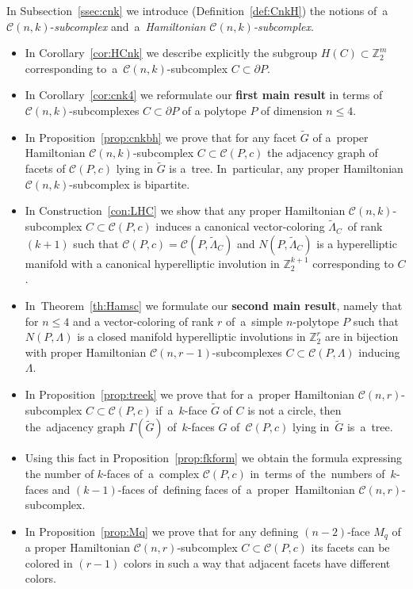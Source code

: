\documentclass[12pt]{amsart}
\theoremstyle{definition}
\theoremstyle{remark}
\begin{document}
In Subsection~\ref{ssec:cnk} we introduce (Definition~\ref{def:CnkH}) the notions 
of~a~$\mathcal{C}(n,k)$-{\it subcomplex} and~a~{\it Hamiltonian $\mathcal{C}(n,k)$-subcomplex}. 
\begin{itemize}
\item In Corollary~\ref{cor:HCnk} we describe explicitly the subgroup $H(C)\subset\mathbb Z_2^m$ corresponding
to~a~$\mathcal{C}(n,k)$-subcomplex $C\subset \partial P$. 
\item In Corollary~\ref{cor:cnk4} we reformulate 
our {\bf first main result} in terms of  \linebreak$\mathcal{C}(n,k)$-subcomplexes $C\subset \partial P$
of a polytope $P$ of dimension $n\leqslant 4$. 
\item In Proposition~\ref{prop:cnkbh}
we prove that for any facet $\widetilde{G}$ of a~proper Hamiltonian $\mathcal{C}(n,k)$-subcomplex $C\subset\mathcal{C}(P,c)$
the adjacency graph of facets of $\mathcal{C}(P,c)$ lying in $\widetilde{G}$ is a~tree. In~particular, 
any proper Hamiltonian $\mathcal{C}(n,k)$-subcomplex is bipartite.
\item In Construction~\ref{con:LHC} we show that any proper Hamiltonian 
$\mathcal{C}(n,k)$-subcomplex $C\subset\mathcal{C}(P,c)$ induces a canonical vector-coloring 
$\widetilde{\Lambda}_C$~of rank $(k+1)$ such that $\mathcal{C}(P,c)=\mathcal{C}(P,\widetilde{\Lambda}_C)$
and $N(P,\widetilde{\Lambda}_C)$ is a hyperelliptic manifold with a canonical hyperelliptic involution
in $\mathbb Z_2^{k+1}$ corresponding to $C$.
\item  In~Theorem~\ref{th:Hamsc} we formulate our 
{\bf second main result}, namely that for $n\leqslant 4$ and a vector-coloring of rank $r$ 
of~a~simple $n$-polytope $P$ such that $N(P,\Lambda)$ is a closed manifold
hyperelliptic involutions in $\mathbb Z_2^r$ are in bijection with proper Hamiltonian $\mathcal{C}(n,r-1)$-subcomplexes 
$C\subset\mathcal{C}(P,\Lambda)$ inducing $\Lambda$. 
\item In Proposition~\ref{prop:treek} we prove
that for a~proper Hamiltonian $\mathcal{C}(n,r)$-subcomplex $C\subset \mathcal{C}(P,c)$ if~a~$k$-face 
$\widetilde{G}$ of $C$ is not a circle, then the~adjacency graph $\Gamma(\widetilde{G})$ of~$k$-faces 
$G$ of~$\mathcal{C}(P,c)$ lying in~$\widetilde{G}$ is~a~tree.
\item  Using this fact in Proposition~\ref{prop:fkform}
we obtain the formula expressing the number of $k$-faces of~a~complex $\mathcal{C}(P,c)$
in~terms of~the~numbers of~$k$-faces and $(k-1)$-faces of~defining faces 
of~a~proper~Hamiltonian $\mathcal{C}(n,r)$-subcomplex.
\item  In Proposition~\ref{prop:Mq} we prove that for any defining
$(n-2)$-face $M_q$ of a proper Hamiltonian $\mathcal{C}(n,r)$-subcomplex $C\subset\mathcal{C}(P,c)$
its facets can be colored in $(r-1)$ colors in such a way that adjacent facets have different colors.
\end{itemize}
\end{document}

